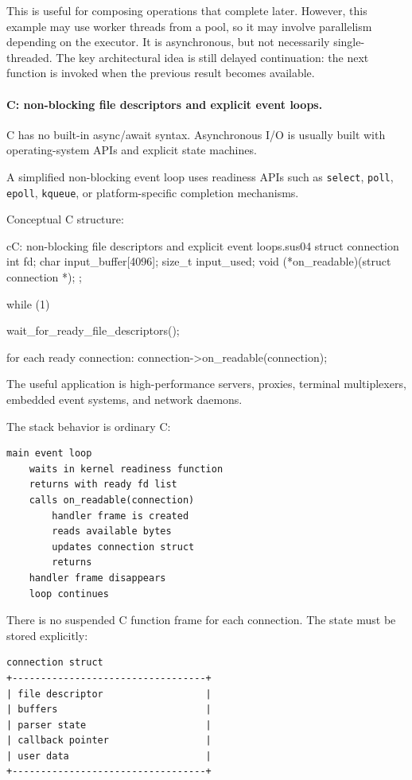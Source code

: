 This is useful for composing operations that complete later. However, this example may use worker threads from a pool, so it may involve parallelism depending on the executor. It is asynchronous, but not necessarily single-threaded. The key architectural idea is still delayed continuation: the next function is invoked when the previous result becomes available.

\paragraph{C: non-blocking file descriptors and explicit event loops.}

C has no built-in async/await syntax. Asynchronous I/O is usually built with operating-system APIs and explicit state machines.

A simplified non-blocking event loop uses readiness APIs such as \texttt{select}, \texttt{poll}, \texttt{epoll}, \texttt{kqueue}, or platform-specific completion mechanisms.

Conceptual C structure:

\begin{codebox}[]{c}{C: non-blocking file descriptors and explicit event loops.}{sus04}
struct connection {
    int fd;
    char input_buffer[4096];
    size_t input_used;
    void (*on_readable)(struct connection *);
};

while (1) {
    wait_for_ready_file_descriptors();

    for each ready connection:
        connection->on_readable(connection);
}
\end{codebox}


The useful application is high-performance servers, proxies, terminal multiplexers, embedded event systems, and network daemons.

The stack behavior is ordinary C:

\begin{verbatim}
main event loop
    waits in kernel readiness function
    returns with ready fd list
    calls on_readable(connection)
        handler frame is created
        reads available bytes
        updates connection struct
        returns
    handler frame disappears
    loop continues
\end{verbatim}

There is no suspended C function frame for each connection. The state must be stored explicitly:

\begin{verbatim}
connection struct
+----------------------------------+
| file descriptor                  |
| buffers                          |
| parser state                     |
| callback pointer                 |
| user data                        |
+----------------------------------+
\end{verbatim}


